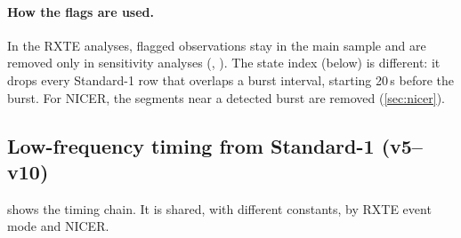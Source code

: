 \paragraph{How the flags are used.} In the RXTE analyses, flagged observations stay in the main sample and are removed only
in sensitivity analyses (, ). The state index (below) is
different: it drops every Standard-1 row that overlaps a burst interval, starting 20\,s before the burst. For NICER, the
segments near a detected burst are removed (\cref{sec:nicer}).

\subsection{Low-frequency timing from Standard-1 (v5--v10)}\label{sec:std1timing}
 shows the timing chain. It is shared, with different constants, by RXTE event mode and NICER.

